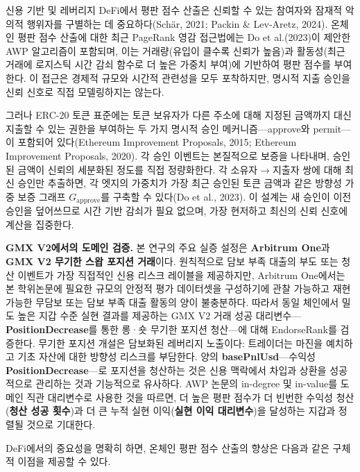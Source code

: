 신용 기반 및 레버리지 DeFi에서 평판 점수 산출은 신뢰할 수 있는 참여자와 잠재적 악의적 행위자를 구별하는 데 중요하다(Sch\"{a}r, 2021; Packin \& Lev-Aretz, 2024). 온체인 평판 점수 산출에 대한 최근 PageRank 영감 접근법에는 Do et al.(2023)이 제안한 AWP 알고리즘이 포함되며, 이는 거래량(유입이 클수록 신뢰가 높음)과 활동성(최근 거래에 로지스틱 시간 감쇠 함수로 더 높은 가중치 부여)에 기반하여 평판 점수를 부여한다. 이 접근은 경제적 규모와 시간적 관련성을 모두 포착하지만, 명시적 지출 승인을 신뢰 신호로 직접 모델링하지는 않는다.


그러나 ERC-20 토큰 표준에는 토큰 보유자가 다른 주소에 대해 지정된 금액까지 대신 지출할 수 있는 권한을 부여하는 두 가지 명시적 승인 메커니즘---approve와 permit---이 포함되어 있다(Ethereum Improvement Proposals, 2015; Ethereum Improvement Proposals, 2020). 각 승인 이벤트는 본질적으로 보증을 나타내며, 승인된 금액이 신뢰의 세분화된 정도를 직접 정량화한다. 각 소유자\(\to\)지출자 쌍에 대해 최신 승인만 추출하면, 각 엣지의 가중치가 가장 최근 승인된 토큰 금액과 같은 방향성 가중 보증 그래프 $G_{\text{approve}}$를 구축할 수 있다(Do et al., 2023). 이 설계는 새 승인이 이전 승인을 덮어쓰므로 시간 기반 감쇠가 필요 없으며, 가장 현저하고 최신의 신뢰 신호에 계산을 집중한다.


\textbf{GMX V2에서의 도메인 검증.} 본 연구의 주요 실증 설정은 \textbf{Arbitrum One}과 \textbf{GMX V2 무기한 스왑 포지션 거래}이다. 원칙적으로 담보 부족 대출의 부도 또는 청산 이벤트가 가장 직접적인 신용 리스크 레이블을 제공하지만, Arbitrum One에서는 본 학위논문에 필요한 규모의 안정적 평가 데이터셋을 구성하기에 관찰 가능하고 재현 가능한 무담보 또는 담보 부족 대출 활동의 양이 불충분하다. 따라서 동일 체인에서 밀도 높은 지갑 수준 실현 결과를 제공하는 GMX V2 거래 성공 대리변수---\textbf{PositionDecrease}를 통한 롱·숏 무기한 포지션 청산---에 대해 EndorseRank를 검증한다. 무기한 포지션 개설은 담보화된 레버리지 노출이다: 트레이더는 마진을 예치하고 기초 자산에 대한 방향성 리스크를 부담한다. 양의 \textbf{basePnlUsd}---수익성 \textbf{PositionDecrease}---로 포지션을 청산하는 것은 신용 맥락에서 차입과 상환을 성공적으로 관리하는 것과 기능적으로 유사하다. AWP 논문의 in-degree 및 in-value를 도메인 직관 대리변수로 사용한 것을 따르면, 더 높은 평판 점수가 더 빈번한 수익성 청산(\textbf{청산 성공 횟수})과 더 큰 누적 실현 이익(\textbf{실현 이익 대리변수})을 달성하는 지갑과 정렬될 것으로 기대한다.


DeFi에서의 중요성을 명확히 하면, 온체인 평판 점수 산출의 향상은 다음과 같은 구체적 이점을 제공할 수 있다.


